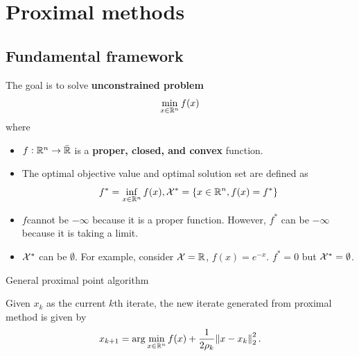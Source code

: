 \begin{refsection}
\begin{remark}
	
\end{remark}


\section{Proximal methods}
\subsection{Fundamental framework}
\begin{definition}
The goal is to solve \textbf{unconstrained problem}
$$\min_{x\in \mathbb{R}^n} f(x)$$
where
\begin{itemize}
	\item $f:\mathbb{R}^n \to \bar{\mathbb{R}}$ is a \textbf{proper, closed, and convex} function.
	\item The optimal objective value and optimal solution set are defined as
	$$f^* = \inf_{x\in \mathbb{R}^n} f(x), \mathcal{X}^* = \{x\in \mathbb{R}^n, f(x) = f^*\}$$
\end{itemize}
\end{definition}

\begin{remark}\hfill
\begin{itemize}
	\item $f$cannot be  $-\infty$ because it is a proper function. However, $f^*$ can be $-\infty$ because it is taking a limit.
	\item $\mathcal{X}^*$ can be $\emptyset$. For example, consider $\mathcal{X} = \mathbb{R}$, $f(x) = e^{-x}$. $f^* = 0$ but $\mathcal{X}^* = \emptyset$.
\end{itemize}	
\end{remark}



\begin{algorithm}[H]
	\SetAlgoLined
	\caption{General proximal point algorithm}
\end{algorithm}

\begin{definition}\label{ch:convex-optimization:def:newiteratefromProximalMethod}
Given $x_k$ as the current $k$th iterate, the new iterate generated from proximal method is given by
$$x_{k+1} = \arg\min_{x\in \mathbb{R}^n} f(x) + \frac{1}{2\rho_k}\norm{x - x_k}_2^2.$$
\end{definition}



\end{refsection}
